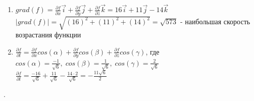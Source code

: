 \documentclass[a4paper,11pt]{article}
\begin{document}
\begin{enumerate}
	
	\item $ grad(f) = \frac{\partial f}{\partial x} \vec{i} + \frac{\partial f}{\partial y} \vec{j} + \frac{\partial f}{\partial z} \vec{k} = 16\vec{i} + 11\vec{j} - 14\vec{k} $ \\[2pt]
	$ |grad(f)| = \sqrt{(16)^2 + (11)^2 + (14)^2} = \sqrt{573} $ - наибольшая скорость возрастания функции
	
	\item
	$
	\frac{\partial f}{\partial l} = \frac{\partial f}{\partial x} cos(\alpha) + \frac{\partial f}{\partial y} cos(\beta) + \frac{\partial f}{\partial z} cos(\gamma)  
	$, где $ cos(\alpha) = \frac{-1}{\sqrt{6}}, \;  cos(\beta) = \frac{1}{\sqrt{6}}, \;  cos(\gamma) = \frac2{\sqrt{6}} $ \\[4pt]
	$ \frac{\partial f}{\partial l} = \frac{-16}{\sqrt{6}} + \frac{11}{\sqrt{6}} - \frac{14 \cdot 2}{\sqrt{6}} = -\frac{11\sqrt{6}}{2}$
\end{enumerate}
.
\\ \\ \\
\end{document}
